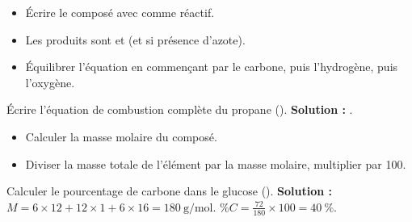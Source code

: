 \begin{itemize}
    \item Écrire le composé avec  comme réactif.
    \item Les produits sont  et  (et  si présence d'azote).
    \item Équilibrer l'équation en commençant par le carbone, puis l'hydrogène, puis l'oxygène.
\end{itemize}
\begin{exemple}
Écrire l'équation de combustion complète du propane ().
\noindent \textbf{Solution :} .
\end{exemple}

\begin{itemize}
    \item Calculer la masse molaire du composé.
    \item Diviser la masse totale de l'élément par la masse molaire, multiplier par 100.
\end{itemize}
\begin{exemple}
Calculer le pourcentage de carbone dans le glucose ().
\noindent \textbf{Solution :} $M = 6\times12 + 12\times1 + 6\times16 = \SI{180}{\gram\per\mol}$. $\%C = \frac{72}{180} \times 100 = \SI{40}{\%}$.
\end{exemple}